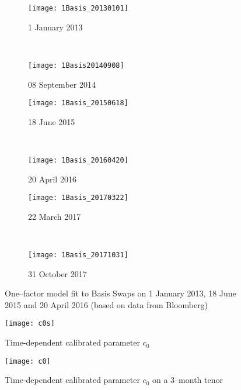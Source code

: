 \documentclass[12pt,a4paper]{article}
\theoremstyle{plain}
\numberwithin{equation}{section}
\begin{document}
\begin{figure}[t]
  \centering
    \begin{subfigure}[b]{0.53\textwidth}
        \texttt{[image: 1Basis\_20130101]}
        \caption{1 January 2013}
        \label{fig:uc}
    \end{subfigure}
    ~
        \begin{subfigure}[b]{0.55\textwidth}
        \texttt{[image: 1Basis20140908]}
       \caption{08 September 2014}
        \label{figxc}
    \end{subfigure}

    \begin{subfigure}[b]{0.55\textwidth}
        \texttt{[image: 1Basis\_20150618]}
       \caption{18 June 2015}
        \label{figxc}
    \end{subfigure}
          ~
    \begin{subfigure}[b]{0.53\textwidth}
        \texttt{[image: 1Basis\_20160420]}
       \caption{20 April 2016}
        \label{figxb}
    \end{subfigure}

     \begin{subfigure}[b]{0.53\textwidth}
        \texttt{[image: 1Basis\_20170322]}
       \caption{22 March 2017}
        \label{figx}
    \end{subfigure}
    ~
     \begin{subfigure}[b]{0.53\textwidth}
        \texttt{[image: 1Basis\_20171031]}
       \caption{31 October 2017}
        \label{figxa}
    \end{subfigure}
\caption{One--factor model fit to Basis Swaps on 1 January 2013,  18 June 2015 and 20 April 2016 (based on data from Bloomberg)}\label{CDSbasis1factor}
\end{figure}

 \begin{figure}[t]
  \centering

 \texttt{[image: c0s]}

\caption{Time-dependent calibrated parameter $c_0$ }\label{c0plot}
\end{figure}

 \begin{figure}[t]
  \centering

 \texttt{[image: c0]}

\caption{Time-dependent calibrated parameter $c_0$ on a 3--month tenor }\label{c03m}
\end{figure}
\end{document}
